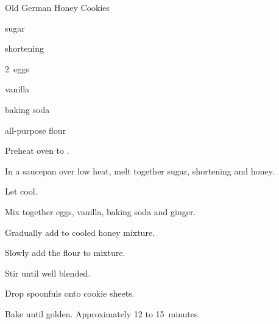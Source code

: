 \begin{recipe}{Old German Honey Cookies}{}{}

\begin{ingredients}
\item {} sugar
\item {} shortening
\item {} 
\item 2~eggs
\item {} vanilla
\item {} baking soda
\item {} all-purpose flour
\item {} 
\end{ingredients}

\begin{directions}
\item Preheat oven to .
\item In a saucepan over low heat, melt together sugar, shortening and honey. 
\item Let cool.
\item Mix together eggs, vanilla, baking soda and ginger.
\item Gradually add to cooled honey mixture.
\item Slowly add the flour to mixture.
\item Stir until well blended.
\item Drop spoonfuls onto cookie sheets.
\item Bake until golden. Approximately 12 to 15~minutes.
\end{directions}
\end{recipe}
